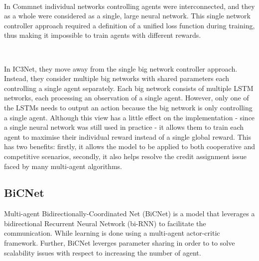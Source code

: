 \documentclass{article}
\begin{document}
\

In Commnet \citep{sukhbaatar2016commnet} individual networks controlling agents were interconnected, and they as a whole were considered as a single, large neural network. This single network controller approach required a definition of a unified loss function during training, thus making it impossible to train agents with different rewards. 

\

In IC3Net, they move away from the single big network controller approach. Instead, they consider multiple big networks with shared parameters each controlling a single agent separately. Each big network consists of multiple LSTM networks, each processing an observation of a single agent. However, only one of the LSTMs needs to output an action because the big network is only controlling a single agent. Although this view has a little effect on the implementation - since a single neural network was still used in practice - it allows them to train each agent to maximise their individual reward instead of a single global reward. This has two benefits: firstly, it allows the model to be applied to both cooperative and competitive scenarios, secondly, it also helps resolve the credit assignment issue faced by many multi-agent algorithms. 

\subsection{BiCNet}

Multi-agent Bidirectionally-Coordinated Net (BiCNet) \citep{peng2017bicnet} is a model that leverages a bidirectional Recurrent Neural Network (bi-RNN) \citep{chuster1997Bidirectional} to facilitate the communication. While learning is done using a multi-agent actor-critic framework. Further, BiCNet leverges parameter sharing in order to to solve scalability issues with respect to increasing the number of agent.

\
\end{document}

